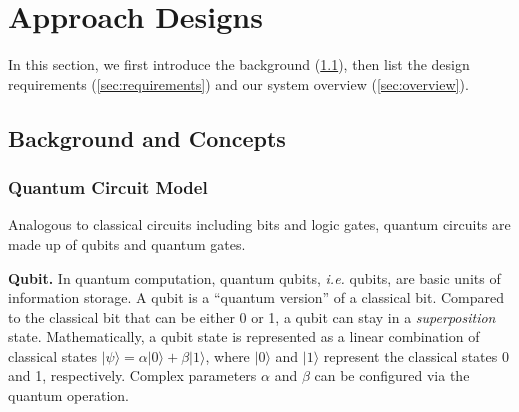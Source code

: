 \section{Approach Designs}
In this section, we first introduce the background (\cref{sec:concepts}), then list the design requirements (\cref{sec:requirements}) and our system overview (\cref{sec:overview}).


\subsection{Background and Concepts}
\label{sec:concepts}
\subsubsection{Quantum Circuit Model}
\label{sec:framework}
Analogous to classical circuits including bits and logic gates, quantum circuits are made up of qubits and quantum gates\cite{Nielsen:2010:QCBook}.

\textbf{Qubit.}
In quantum computation, quantum qubits, \emph{i.e.} qubits, are basic units of information storage.
A qubit is a ``quantum version'' of a classical bit.
Compared to the classical bit that can be either 0 or 1, a qubit can stay in a \emph{superposition} state\cite{Nielsen:2010:QCBook}.
Mathematically, a qubit state is represented as a linear combination of classical states $|\psi\rangle=\alpha|0\rangle + \beta|1\rangle$, where $|0\rangle$ and $|1\rangle$ represent the classical states 0 and 1, respectively.
Complex parameters $\alpha$ and $\beta$ can be configured via the quantum operation.



